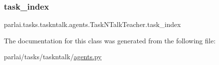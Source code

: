 \subsubsection{\texorpdfstring{task\+\_\+index}{task\_index}}
{\footnotesize\ttfamily parlai.\+tasks.\+taskntalk.\+agents.\+Task\+N\+Talk\+Teacher.\+task\+\_\+index}



The documentation for this class was generated from the following file\+:\begin{DoxyCompactItemize}
\item 
parlai/tasks/taskntalk/\hyperlink{parlai_2tasks_2taskntalk_2agents_8py}{agents.\+py}\end{DoxyCompactItemize}
